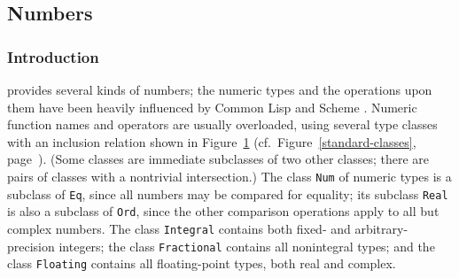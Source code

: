 \subsection{Numbers}
\label{numbers}

\subsubsection{Introduction}

\Haskell{} provides several kinds of numbers; the numeric
types and the operations upon them have been heavily influenced by
Common Lisp \cite{steele:common-lisp} and Scheme \cite{RRRRS}.  Numeric
function names and operators are usually overloaded, using
several type classes with an inclusion relation shown
in Figure~\ref{numeric-inclusions}
(cf.~Figure~\ref{standard-classes}, page~\pageref{standard-classes}).
(Some classes are immediate subclasses of two other classes;
there are pairs of classes with a nontrivial
intersection.) The class \mbox{\tt Num} of numeric types is a subclass of
\mbox{\tt Eq}, since all numbers may be compared for equality;
its subclass \mbox{\tt Real} is also a subclass of
\mbox{\tt Ord}, since the other comparison operations apply to
all but complex numbers.  The class \mbox{\tt Integral}
contains both fixed- and arbitrary-precision integers; the class
\mbox{\tt Fractional} contains all nonintegral types;
and the class \mbox{\tt Floating} contains all floating-point
types, both real and complex.

\begin{figure}
\outline{
%

\struthack{11pt}
}
\label{numeric-inclusions}
\end{figure}


